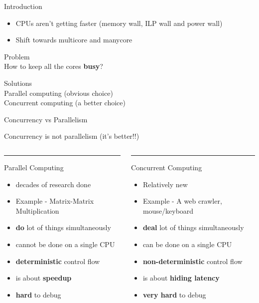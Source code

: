 \begin{frame}{Introduction}
\begin{itemize}
\item \small CPUs aren't getting faster (memory wall, ILP wall and power wall)
\item \small Shift towards multicore and manycore
\end{itemize}
\begin{center}
\Large {\color{red} Problem}\\
How to keep all the cores \textbf{busy}?
\end{center}
\pause
\begin{center}
\Large {\color{blue} Solutions}\\
Parallel computing (obvious choice)\\
\pause
Concurrent computing (a better choice)
\end{center}
\end{frame}

\begin{frame}{Concurrency vs Parallelism}
\begin{center}
\Large {\color{blue}Concurrency} is not {\color{red}parallelism} (it's better!!)
\end{center}
\pause
\begin{columns}
\begin{column}[t]{0.48\textwidth}
\color{red}\rule{\linewidth}{4pt}
Parallel Computing
\begin{itemize}
\item decades of research done
\item Example - Matrix-Matrix Multiplication
\item \textbf{do} lot of things simultaneously
\item cannot be done on a single CPU
\item \textbf{deterministic} control flow
\item is about \textbf{speedup}
\item \textbf{hard} to debug
\end{itemize}
\end{column}
\begin{column}[t]{0.48\textwidth}
\color{blue}\rule{\linewidth}{4pt}
Concurrent Computing
\begin{itemize}
\item Relatively new
\item Example - A web crawler, mouse/keyboard
\item \textbf{deal} lot of things simultaneously
\item can be done on a single CPU
\item \textbf{non-deterministic} control flow
\item is about \textbf{hiding latency}
\item \textbf{very hard} to debug
\end{itemize}
\end{column}
\end{columns}
\end{frame}